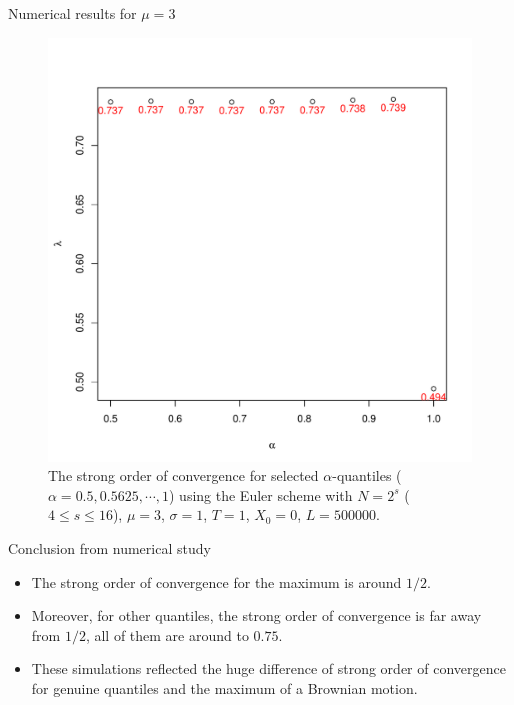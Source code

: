 \documentclass[cjk,10pt]{beamer}
\begin{document}
\begin{frame}{Numerical results for $\mu=3$} 
\begin{figure}[p]
   \includegraphics[scale=0.3]{nout_4_25_3arato.pdf} %
   \caption{The strong order of convergence for selected $\alpha$-quantiles ($\alpha = 0.5, 0.5625, \cdots, 1$) using the Euler scheme with $N = 2^s$ ($4\le s \le 16$), $\mu=3$, $\sigma=1$, $T=1$, $X_0=0$, $L=500000$.}
   \label{f:ratio3}
\end{figure}
\end{frame}

\begin{frame}{Conclusion from numerical study}
\begin{itemize}
\item
The strong order of convergence for the maximum is around $1/2$.
\item
Moreover, for other quantiles, the strong order of convergence is far away from $1/2$, all of them are around to $0.75$.
\item
These simulations reflected the huge difference of strong order of convergence for genuine quantiles and the maximum of a Brownian motion.
\end{itemize}
\end{frame}
\end{document}
